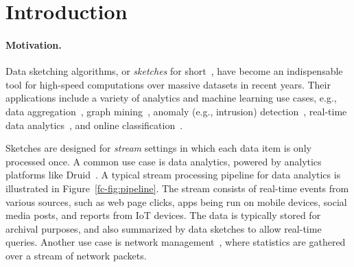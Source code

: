 \section{Introduction}

\paragraph{Motivation.}
Data sketching algorithms, or \emph{sketches} for short~\cite{Cormode:2017}, have become 
an indispensable tool for high-speed computations over massive datasets in recent years. 
Their applications include a variety of analytics and machine learning use cases, e.g., data aggregation~\cite{agarwal2013mergeable, KMV}, graph mining~\cite{Cohen:2014}, anomaly (e.g., intrusion) detection~\cite{yang2018elastic}, real-time data analytics~\cite{druid}, and online classification~\cite{Tai:2018}.

Sketches are designed for \emph{stream} settings in which each data item is only processed once. A common use case is data analytics, powered by analytics platforms like Druid~\cite{druid}. A typical stream processing pipeline for data analytics is illustrated in Figure~\ref{fc-fig:pipeline}. The stream consists of real-time events from various sources, such as web page clicks, apps being run on mobile devices, social media posts, and reports from IoT devices. The data is typically stored for archival purposes, and also summarized by data sketches to allow real-time queries. Another use case is network management~\cite{Cormode:2017}, where statistics are gathered over a stream of network packets.  

